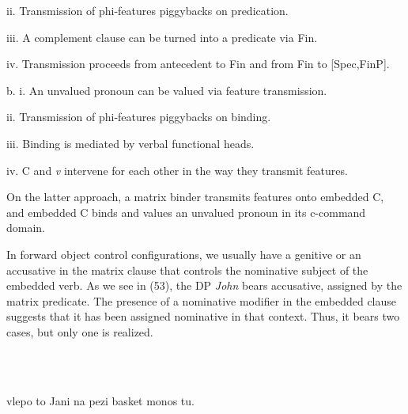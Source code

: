 \documentclass[output=paper]{langsci/langscibook}
\begin{document}
\begin{stylepi}
ii.   Transmission of phi-features piggybacks on predication.
\end{stylepi}

\begin{stylepi}
iii.   A complement clause can be turned into a predicate via Fin.
\end{stylepi}

\begin{stylepi}
iv.   Transmission proceeds from antecedent to Fin and from Fin to [Spec,FinP].
\end{stylepi}

\begin{stylepi}
  b.  i.   An unvalued pronoun can be valued via feature transmission.
\end{stylepi}

\begin{stylepi}
ii.   Transmission of phi-features piggybacks on binding.
\end{stylepi}

\begin{stylepi}
iii.   Binding is mediated by verbal functional heads.
\end{stylepi}

\begin{stylepi}
iv.   C and \textit{v} intervene for each other in the way they transmit features.
\end{stylepi}

\begin{stylepi}
On the latter approach, a matrix binder transmits features onto embedded C, and embedded C binds and values an unvalued pronoun in its c-command domain.
\end{stylepi}

  In forward object control configurations, we usually have a genitive or an accusative in the matrix clause that controls the nominative subject of the embedded verb. As we see in (53), the DP \textit{John} bears accusative, assigned by the matrix predicate. The presence of a nominative modifier in the embedded clause suggests that it has been assigned nominative in that context. Thus, it bears two cases, but only one is realized.

\ea%
    \label{ex:key:53}
    \gll\\
        \\
    \glt
    \z

            vlepo to    Jani        na   pezi        basket  monos tu.
\end{document}
